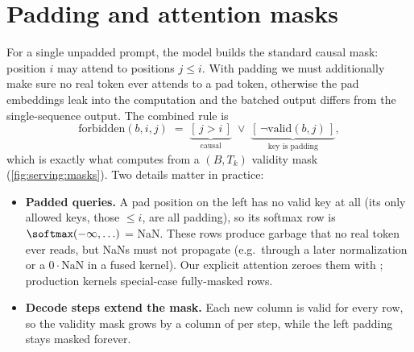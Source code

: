 \section{Padding and attention masks}\label{sec:serving:masks}

For a single unpadded prompt, the model builds the standard causal mask: position $i$ may attend
to positions $j\le i$. With padding we must additionally make sure no real token ever attends to a
pad token, otherwise the pad embeddings leak into the computation and the batched output differs
from the single-sequence output. The combined rule is
\begin{equation}\label{eq:serving:mask}
  \text{forbidden}(b,i,j) \;=\; \underbrace{[\,j>i\,]}_{\text{causal}} \;\lor\; \underbrace{[\,\neg\text{valid}(b,j)\,]}_{\text{key is padding}},
\end{equation}
which is exactly what  computes from a $(B,T_k)$ validity mask
(\cref{fig:serving:masks}). Two details matter in practice:
\begin{itemize}
  \item \textbf{Padded queries.} A pad position on the left has no valid key at all (its only
    allowed keys, those $\le i$, are all padding), so its softmax row is $\softmax(-\infty,\ldots)$ =
    NaN. These rows produce garbage that no real token ever reads, but NaNs must not propagate
    (e.g.\ through a later normalization or a $0\cdot\text{NaN}$ in a fused kernel). Our explicit attention
    zeroes them with ; production kernels special-case fully-masked rows.
  \item \textbf{Decode steps extend the mask.} Each new column is valid for every row, so the
    validity mask grows by a column of  per step, while the left padding stays masked
    forever.
\end{itemize}

